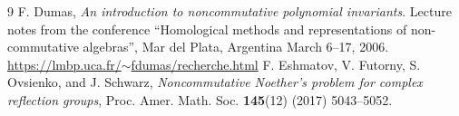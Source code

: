 \documentclass[12pt, a4paper]{amsart}
\begin{document}
\begin{thebibliography}{9}
{\sc F. Dumas},
{\em An introduction to noncommutative polynomial invariants}. Lecture notes from the conference ``Homological methods and representations of non-commutative algebras'', Mar del Plata, Argentina March 6--17, 2006.\\
\href{https://lmbp.uca.fr/$\sim$fdumas/recherche.html}{https://lmbp.uca.fr/$\sim$fdumas/recherche.html}
{\sc F. Eshmatov, V. Futorny, S. Ovsienko, and J. Schwarz},
{\em Noncommutative Noether’s problem
for complex reflection groups},
Proc. Amer. Math. Soc. {\bf 145}(12) (2017) 5043--5052.%

\end{thebibliography}
\end{document}
